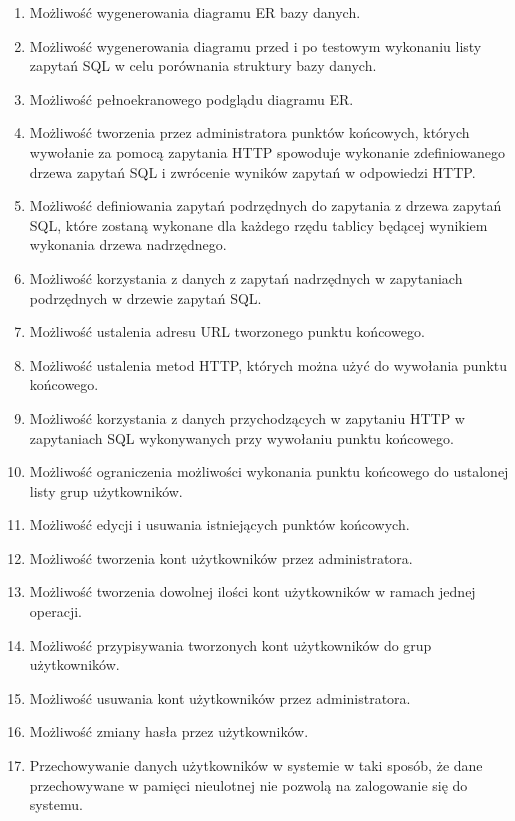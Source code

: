 \begin{enumerate}
    \item Możliwość wygenerowania diagramu ER bazy danych.

    \item Możliwość wygenerowania diagramu przed i po testowym wykonaniu listy
        zapytań SQL w celu porównania struktury bazy danych.

    \item Możliwość pełnoekranowego podglądu diagramu ER.

    \item Możliwość tworzenia przez administratora punktów końcowych, których
        wywołanie za pomocą zapytania HTTP spowoduje wykonanie zdefiniowanego
        drzewa zapytań SQL i zwrócenie wyników zapytań w odpowiedzi HTTP.

    \item Możliwość definiowania zapytań podrzędnych do zapytania z drzewa
        zapytań SQL, które zostaną wykonane dla każdego rzędu tablicy będącej
        wynikiem wykonania drzewa nadrzędnego.

    \item Możliwość korzystania z danych z zapytań nadrzędnych w zapytaniach
        podrzędnych w drzewie zapytań SQL.

    \item Możliwość ustalenia adresu URL tworzonego punktu końcowego.

    \item Możliwość ustalenia metod HTTP, których można użyć do wywołania punktu
        końcowego.

    \item Możliwość korzystania z danych przychodzących w zapytaniu HTTP w
        zapytaniach SQL wykonywanych przy wywołaniu punktu końcowego.

    \item Możliwość ograniczenia możliwości wykonania punktu końcowego do
        ustalonej listy grup użytkowników.

    \item Możliwość edycji i usuwania istniejących punktów końcowych.

    \item Możliwość tworzenia kont użytkowników przez administratora.

    \item Możliwość tworzenia dowolnej ilości kont użytkowników w ramach jednej
        operacji.

    \item Możliwość przypisywania tworzonych kont użytkowników do grup
        użytkowników.

    \item Możliwość usuwania kont użytkowników przez administratora.

    \item Możliwość zmiany hasła przez użytkowników.

    \item Przechowywanie danych użytkowników w systemie w taki sposób, że dane
        przechowywane w pamięci nieulotnej nie pozwolą na zalogowanie się do
        systemu.

\end{enumerate}

